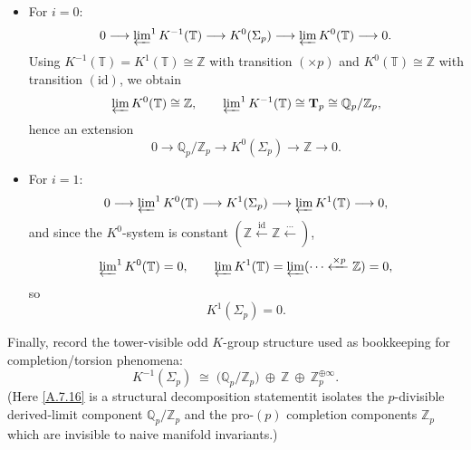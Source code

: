 \documentclass[11pt]{article}
\theoremstyle{remark}
\begin{document}
\begin{itemize}
\item For $i=0$:
\begin{equation}
0\longrightarrow \varprojlim\nolimits^{1}K^{-1}(\mathbb T)
\longrightarrow K^{0}(\Sigma_{p})
\longrightarrow \varprojlim K^{0}(\mathbb T)
\longrightarrow 0.
\label{A.7.10}
\end{equation}
Using $K^{-1}(\mathbb T)=K^{1}(\mathbb T)\cong\mathbb Z$ with transition $(\times p)$ and $K^{0}(\mathbb T)\cong\mathbb Z$ with transition $(\mathrm{id})$, we obtain
\begin{equation}
\varprojlim K^{0}(\mathbb T)\cong \mathbb Z,
\qquad
\varprojlim\nolimits^{1}K^{-1}(\mathbb T)\cong \mathbf{T}_{p}\cong \mathbb Q_{p}/\mathbb Z_{p},
\label{A.7.11}
\end{equation}
hence an extension
\begin{equation}
0\longrightarrow \mathbb Q_{p}/\mathbb Z_{p}
\longrightarrow K^{0}(\Sigma_{p})
\longrightarrow \mathbb Z
\longrightarrow 0.
\label{A.7.12}
\end{equation}

\item For $i=1$:
\begin{equation}
0\longrightarrow \varprojlim\nolimits^{1}K^{0}(\mathbb T)
\longrightarrow K^{1}(\Sigma_{p})
\longrightarrow \varprojlim K^{1}(\mathbb T)
\longrightarrow 0,
\label{A.7.13}
\end{equation}
and since the $K^{0}$-system is constant $(\mathbb Z\xleftarrow{\mathrm{id}}\mathbb Z\xleftarrow{\cdots})$,
\begin{equation}
\varprojlim\nolimits^{1}K^{0}(\mathbb T)=0,
\qquad
\varprojlim K^{1}(\mathbb T)=\varprojlim(\cdots \xleftarrow{\times p}\mathbb Z)=0,
\label{A.7.14}
\end{equation}
so
\begin{equation}
K^{1}(\Sigma_{p})=0.
\label{A.7.15}
\end{equation}
\end{itemize}

Finally, record the tower-visible odd $K$-group structure used as bookkeeping for completion/torsion phenomena:
\begin{equation}
K^{-1}(\Sigma_{p})
\;\cong\;
\bigl(\mathbb Q_{p}/\mathbb Z_{p}\bigr)\ \oplus\ \mathbb Z\ \oplus\ \mathbb Z_{p}^{\oplus\infty}.
\label{A.7.16}
\end{equation}
(Here \eqref{A.7.16} is a structural decomposition statement\:it isolates the $p$-divisible derived-limit component $\mathbb Q_{p}/\mathbb Z_{p}$ and the pro-$(p)$ completion components $\mathbb Z_{p}$ which are invisible to naive manifold invariants.)
\end{document}
